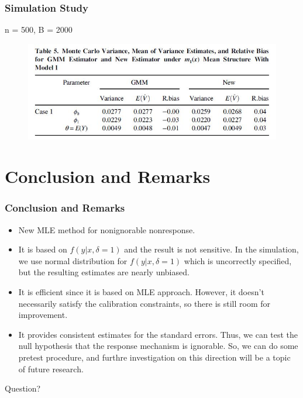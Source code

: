 \documentclass{beamer}
\newcommand{\bra}[1]{\left(#1\right)}
\newcommand{\e}[1]{$\displaystyle{#1}$}
\begin{document}
\begin{frame}
\frametitle{Simulation Study}
\centerline{n = 500, B = 2000}
\begin{figure}
\includegraphics[width=1\linewidth]{table5.jpg}
\end{figure}
\end{frame}

\section{Conclusion and Remarks}

\begin{frame}
\frametitle{Conclusion and Remarks}
\begin{itemize}
\item New MLE method for nonignorable nonresponse.\smallskip
\item It is based on \e{f\bra{y|x,\delta=1}} and the result is not sensitive. In the simulation, we use normal distribution for \e{f\bra{y|x,\delta=1}} which is uncorrectly specified, but the resulting estimates are nearly unbiased.\smallskip
\item It is efficient since it is based on MLE approach. However, it doesn't necessarily satisfy the calibration constraints, so there is still room for improvement.\smallskip
\item It provides consistent estimates for the standard errors. Thus, we can test the null hypothesis that the response mechanism is ignorable. So, we can do some pretest procedure, and furthre investigation on this direction will be a topic of future research.
\end{itemize}
\end{frame}

\begin{frame}
\centerline{\huge{Question?}}
\end{frame}
\end{document}
